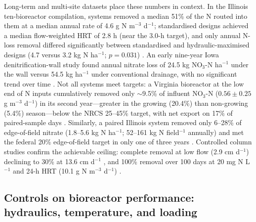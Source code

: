 \documentclass[11pt]{article}
\begin{document}
Long-term and multi-site datasets place these numbers in context. In the Illinois ten-bioreactor compilation, systems removed a median 51\% of the N routed into them at a median annual rate of 4.6 g N m$^{-3}$ d$^{-1}$; standardised designs achieved a median flow-weighted HRT of 2.8 h (near the 3.0-h target), and only annual N-loss removal differed significantly between standardised and hydraulic-maximised designs (4.7 versus 3.2 kg N ha$^{-1}$; $p=0.031$) \parencite{Christianson2026}. An early nine-year Iowa denitrification-wall study found annual nitrate loss of 24.5 kg NO$_3$-N ha$^{-1}$ under the wall versus 54.5 kg ha$^{-1}$ under conventional drainage, with no significant trend over time \parencite{Moorman2010}. Not all systems meet targets: a Virginia bioreactor at the low end of N inputs cumulatively removed only $\sim$9.5\% of influent NO$_3$-N ($0.56 \pm 0.25$ g m$^{-3}$ d$^{-1}$) in its second year---greater in the growing (20.4\%) than non-growing (5.4\%) season---below the NRCS 25--45\% target, with net export on 17\% of paired-sample days \parencite{Bock2018}. Similarly, a paired Illinois system removed only 6--28\% of edge-of-field nitrate (1.8--5.6 kg N ha$^{-1}$; 52--161 kg N field$^{-1}$ annually) and met the federal 20\% edge-of-field target in only one of three years \parencite{Maxwell2022}. Controlled column studies confirm the achievable ceiling: complete removal at low flow (2.9 cm d$^{-1}$) declining to 30\% at 13.6 cm d$^{-1}$ \parencite{Greenan2009}, and 100\% removal over 100 days at 20 mg N L$^{-1}$ and 24-h HRT (10.1 g N m$^{-3}$ d$^{-1}$) \parencite{Hua2016}.

\subsection{Controls on bioreactor performance: hydraulics, temperature, and loading}
\end{document}
